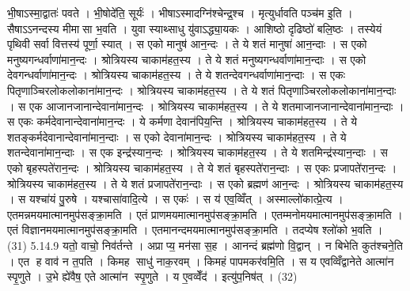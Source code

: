भी॒षाऽस्मा॒द्वातः॑ पवते । भी॒षोदे॑ति॒ सूर्यः॑ । भीषाऽस्मादग्नि॑श्चेन्द्र॒श्च । मृत्युर्धावति पञ्च॑म इ॒ति । सैषाऽऽनन्दस्य मीमा॑सा भ॒वति । युवा स्याथ्साधु यु॑वाऽद्ध्या॒यकः । आशिष्ठो दृढिष्ठो॑ बलि॒ष्ठः । तस्येयं पृथिवी सर्वा वित्तस्य॑ पूर्णा॒ स्यात् । स एको मानुष॑ आन॒न्दः । ते ये शतं मानुषा॑ आन॒न्दाः । स एको मनुष्यगन्धर्वाणा॑मान॒न्दः । श्रोत्रियस्य चाकाम॑हत॒स्य । ते ये शतं मनुष्यगन्धर्वाणा॑मान॒न्दाः । स एको देवगन्धर्वाणा॑मान॒न्दः । श्रोत्रियस्य चाकाम॑हत॒स्य । ते ये शतन्देवगन्धर्वाणा॑मान॒न्दाः । स एकः पितृणाञ्चिरलोकलोकाना॑मान॒न्दः । श्रोत्रियस्य चाकाम॑हत॒स्य । ते ये शतं पितृणाञ्चिरलोकलोकाना॑मान॒न्दाः । स एक आजानजानान्देवाना॑मान॒न्दः । श्रोत्रियस्य चाकाम॑हत॒स्य । ते ये शतमाजानजानान्देवाना॑मान॒न्दाः । स एकः कर्मदेवानान्देवाना॑मान॒न्दः । ये कर्मणा देवान॑पिय॒न्ति । श्रोत्रियस्य चाकाम॑हत॒स्य । ते ये शतङ्कर्मदेवानान्देवाना॑मान॒न्दाः । स एको देवाना॑मान॒न्दः । श्रोत्रियस्य चाकाम॑हत॒स्य । ते ये शतन्देवाना॑मान॒न्दाः । स एक इन्द्र॑स्यान॒न्दः । श्रोत्रियस्य चाकाम॑हत॒स्य । ते ये शतमिन्द्र॑स्यान॒न्दाः । स एको बृहस्पते॑रान॒न्दः । श्रोत्रियस्य चाकाम॑हत॒स्य । ते ये शतं बृहस्पते॑रान॒न्दाः । स एकः प्रजापते॑रान॒न्दः । श्रोत्रियस्य चाकाम॑हत॒स्य । ते ये शतं प्रजापते॑रान॒न्दाः । स एको ब्रह्मण॑ आन॒न्दः । श्रोत्रियस्य चाकाम॑हत॒स्य । स यश्चा॑यं पु॒रुषे । यश्चासा॑वादि॒त्ये । स एकः॑ । स य॑ एव॒व्विँत् । अस्माल्लो॑कात्प्रे॒त्य । एतमन्नमयमात्मानमुप॑सङ्क्रा॒मति । एतं प्राणमयमात्मानमुप॑सङ्क्रा॒मति । एतम्मनोमयमात्मानमुप॑सङ्क्रा॒मति । एतं विज्ञानमयमात्मानमुप॑सङ्क्रा॒मति । एतमानन्दमयमात्मानमुप॑सङ्क्रा॒मति । तदप्येष श्लो॑को भ॒वति । (31)
5.14.9
यतो॒ वाचो॒ निव॑र्तन्ते । अप्राप्य॒ मन॑सा स॒ह । आनन्दं ब्रह्म॑णो वि॒द्वान् । न बिभेति कुत॑श्चने॒ति । एत ह वाव॑ न त॒पति । किमह साधु॑ नाक॒रवम् । किमहं पापमकर॑वमि॒ति । स य एवव्विँद्वानेते आत्मा॑न स्पृ॒णुते । उ॒भे ह्ये॑वैष॒ एते आत्मा॑न स्पृ॒णुते । य ए॒वव्वेँद॑ । इत्यु॑प॒निष॑त् । (32)


\setcounter{anuvakam}{0}

